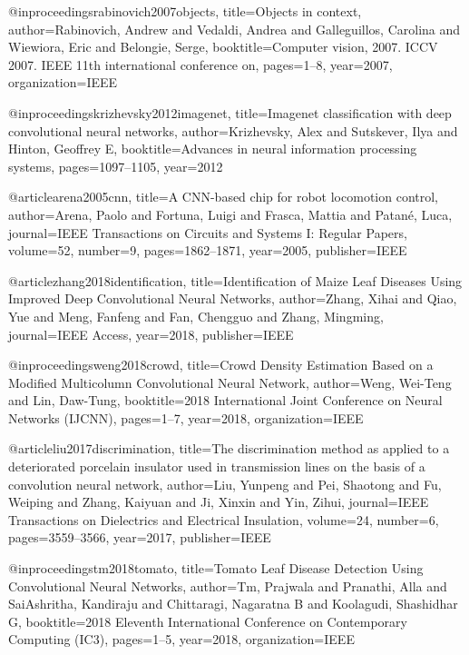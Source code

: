 @inproceedings{rabinovich2007objects,
  title={Objects in context},
  author={Rabinovich, Andrew and Vedaldi, Andrea and Galleguillos, Carolina and Wiewiora, Eric and Belongie, Serge},
  booktitle={Computer vision, 2007. ICCV 2007. IEEE 11th international conference on},
  pages={1--8},
  year={2007},
  organization={IEEE}
}

@inproceedings{krizhevsky2012imagenet,
  title={Imagenet classification with deep convolutional neural networks},
  author={Krizhevsky, Alex and Sutskever, Ilya and Hinton, Geoffrey E},
  booktitle={Advances in neural information processing systems},
  pages={1097--1105},
  year={2012}
}

@article{arena2005cnn,
  title={A CNN-based chip for robot locomotion control},
  author={Arena, Paolo and Fortuna, Luigi and Frasca, Mattia and Patan{\'e}, Luca},
  journal={IEEE Transactions on Circuits and Systems I: Regular Papers},
  volume={52},
  number={9},
  pages={1862--1871},
  year={2005},
  publisher={IEEE}
}

@article{zhang2018identification,
  title={Identification of Maize Leaf Diseases Using Improved Deep Convolutional Neural Networks},
  author={Zhang, Xihai and Qiao, Yue and Meng, Fanfeng and Fan, Chengguo and Zhang, Mingming},
  journal={IEEE Access},
  year={2018},
  publisher={IEEE}
}

@inproceedings{weng2018crowd,
  title={Crowd Density Estimation Based on a Modified Multicolumn Convolutional Neural Network},
  author={Weng, Wei-Teng and Lin, Daw-Tung},
  booktitle={2018 International Joint Conference on Neural Networks (IJCNN)},
  pages={1--7},
  year={2018},
  organization={IEEE}
}

@article{liu2017discrimination,
  title={The discrimination method as applied to a deteriorated porcelain insulator used in transmission lines on the basis of a convolution neural network},
  author={Liu, Yunpeng and Pei, Shaotong and Fu, Weiping and Zhang, Kaiyuan and Ji, Xinxin and Yin, Zihui},
  journal={IEEE Transactions on Dielectrics and Electrical Insulation},
  volume={24},
  number={6},
  pages={3559--3566},
  year={2017},
  publisher={IEEE}
}

@inproceedings{tm2018tomato,
  title={Tomato Leaf Disease Detection Using Convolutional Neural Networks},
  author={Tm, Prajwala and Pranathi, Alla and SaiAshritha, Kandiraju and Chittaragi, Nagaratna B and Koolagudi, Shashidhar G},
  booktitle={2018 Eleventh International Conference on Contemporary Computing (IC3)},
  pages={1--5},
  year={2018},
  organization={IEEE}
}

